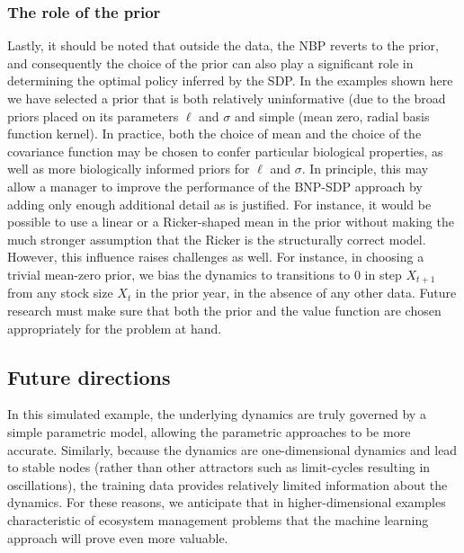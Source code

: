 \documentclass[author-year, review]{elsarticle} %
\begin{document}
\subsubsection{The role of the prior}\label{the-role-of-the-prior}

Lastly, it should be noted that outside the data, the NBP reverts to the
prior, and consequently the choice of the prior can also play a
significant role in determining the optimal policy inferred by the SDP.
In the examples shown here we have selected a prior that is both
relatively uninformative (due to the broad priors placed on its
parameters $\ell$ and $\sigma$ and simple (mean zero, radial basis
function kernel). In practice, both the choice of mean and the choice of
the covariance function may be chosen to confer particular biological
properties, as well as more biologically informed priors for $\ell$ and
$\sigma$. In principle, this may allow a manager to improve the
performance of the BNP-SDP approach by adding only enough additional
detail as is justified. For instance, it would be possible to use a
linear or a Ricker-shaped mean in the prior without making the much
stronger assumption that the Ricker is the structurally correct model.
However, this influence raises challenges as well. For instance, in
choosing a trivial mean-zero prior, we bias the dynamics to transitions
to 0 in step $X_{t+1}$ from any stock size $X_t$ in the prior year, in
the absence of any other data. Future research must make sure that both
the prior and the value function are chosen appropriately for the
problem at hand.

\subsection{Future directions}\label{future-directions}

In this simulated example, the underlying dynamics are truly governed by
a simple parametric model, allowing the parametric approaches to be more
accurate. Similarly, because the dynamics are one-dimensional dynamics
and lead to stable nodes (rather than other attractors such as
limit-cycles resulting in oscillations), the training data provides
relatively limited information about the dynamics. For these reasons, we
anticipate that in higher-dimensional examples characteristic of
ecosystem management problems that the machine learning approach will
prove even more valuable.
\end{document}
